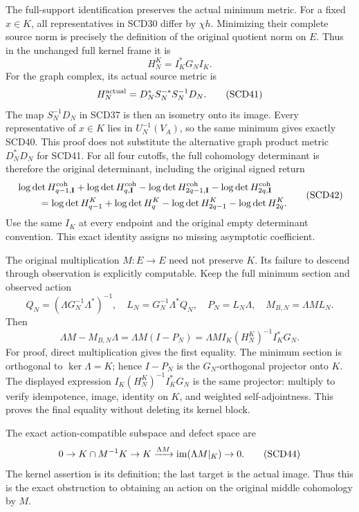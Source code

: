\documentclass[11pt,a4paper]{article}
\theoremstyle{definition}\newtheorem{definition}[theorem]{Definition}
\begin{document}
The full-support identification preserves the actual minimum metric.
For a fixed \(x\in K\), all representatives in SCD30 differ by
\(\chi h\). Minimizing their complete source norm is precisely
the definition of the original quotient norm on \(E\). Thus in
the unchanged full kernel frame it is
\[
 H^K_N=I_K^*G_NI_K .
 \tag{SCD40}
\]
For the graph complex, its actual source metric is
\[
 H_N^{\rm actual}=D_N^*S_N^{-*}S_N^{-1}D_N .
 \tag{SCD41}
\]
The map \(S_N^{-1}D_N\) in SCD37 is then an isometry onto its
image. Every representative of \(x\in K\) lies in
\(U_N^{-1}(V_A)\), so the same minimum gives exactly SCD40.
This proof does not substitute the alternative graph product
metric \(D_N^*D_N\) for SCD41. For all four cutoffs, the full
cohomology determinant is therefore the original determinant,
including the original signed return
\[
 \begin{split}
 &\log\det H^{\rm coh}_{q-1,\mathbf I}
 +\log\det H^{\rm coh}_{q,\mathbf I}
 -\log\det H^{\rm coh}_{2q-1,\mathbf I}
 -\log\det H^{\rm coh}_{2q,\mathbf I}\\
 &\hspace{8mm}=
 \log\det H^K_{q-1}+\log\det H^K_q
 -\log\det H^K_{2q-1}-\log\det H^K_{2q}.
 \end{split}
 \tag{SCD42}
\]
Use the same \(I_K\) at every endpoint and the original empty
determinant convention. This exact identity assigns no missing
asymptotic coefficient.

The original multiplication \(M:E\to E\) need not preserve \(K\).
Its failure to descend through observation is explicitly computable.
Keep the full minimum section and observed action
\[
 Q_N=(\Lambda G_N^{-1}\Lambda^*)^{-1},\quad
 L_N=G_N^{-1}\Lambda^*Q_N,\quad P_N=L_N\Lambda,\quad
 M_{B,N}=\Lambda ML_N .
\]
Then
\[
 \Lambda M-M_{B,N}\Lambda
 =\Lambda M(I-P_N)
 =\Lambda MI_K(H_N^K)^{-1}I_K^*G_N .
 \tag{SCD43}
\]
For proof, direct multiplication gives the first equality.
The minimum section is orthogonal to \(\ker\Lambda=K\);
hence \(I-P_N\) is the \(G_N\)-orthogonal projector onto \(K\).
The displayed expression \(I_K(H_N^K)^{-1}I_K^*G_N\)
is the same projector: multiply to verify idempotence, image,
identity on \(K\), and weighted self-adjointness. This proves
the final equality without deleting its kernel block.

The exact action-compatible subspace and defect space are
\[
 0\to K\cap M^{-1}K\to K
 \xrightarrow{\Lambda M}\operatorname{im}(\Lambda M|_K)\to0.
 \tag{SCD44}
\]
The kernel assertion is its definition; the last target is the
actual image. Thus this is the exact obstruction to obtaining
an action on the original middle cohomology by \(M\).
\end{document}
